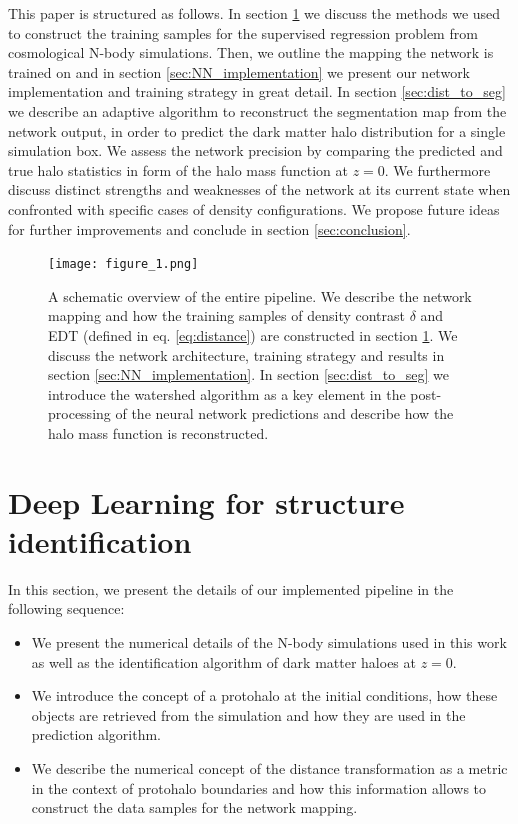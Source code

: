 \documentclass[fleqn,usenatbib]{mnras}
\begin{document}
This paper is structured as follows. In section \ref{sec:DL_structure} we discuss the methods we used to construct the training samples for the supervised regression problem from cosmological N-body simulations. Then, we outline the mapping the network is trained on and in section \ref{sec:NN_implementation} we present our network implementation and training strategy in great detail. In section \ref{sec:dist_to_seg} we describe an adaptive algorithm to reconstruct the segmentation map from the network output, in order to predict the dark matter halo distribution for a single simulation box. We assess the network precision by comparing the predicted and true halo statistics in form of the halo mass function at $z=0$. We furthermore discuss distinct strengths and weaknesses of the network at its current state when confronted with specific cases of density configurations. We propose future ideas for further improvements and conclude in section \ref{sec:conclusion}.

\begin{figure}
 \texttt{[image: figure\_1.png]}
 \caption{A schematic overview of the entire pipeline. We describe the network mapping and how the training samples of density contrast $\delta$ and EDT (defined in eq. \ref{eq:distance}) are constructed in section \ref{sec:DL_structure}. We discuss the network architecture, training strategy and results in section \ref{sec:NN_implementation}. In section \ref{sec:dist_to_seg} we introduce the watershed algorithm as a key element in the post-processing of the neural network predictions and describe how the halo mass function is reconstructed.}
 \label{fig:pipeline}
\end{figure}
\section{Deep Learning for structure identification}
\label{sec:DL_structure}
In this section, we present the details of our implemented pipeline in the following sequence:
\begin{itemize}
    \item We present the numerical details of the N-body simulations used in this work as well as the identification algorithm of dark matter haloes at $z=0$.
    \item We introduce the concept of a protohalo at the initial conditions, how these objects are retrieved from the simulation and how they are used in the prediction algorithm.
    \item We describe the numerical concept of the distance transformation as a metric in the context of protohalo boundaries and how this information allows to construct the data samples for the network mapping.
\end{itemize}
\end{document}
